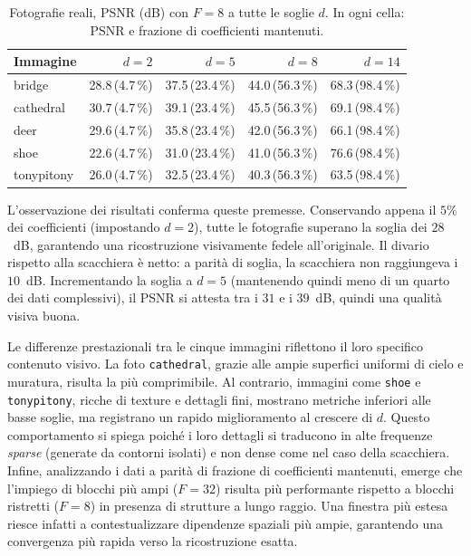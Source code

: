 \documentclass[11pt,a4paper]{article}
\makeatletter
\let\@origtexttt\texttt
\renewcommand{\texttt}[1]{{\def\_{\textunderscore\discretionary{}{}{}}\@origtexttt{#1}}}
\makeatother
\begin{document}
\begin{table}[H]
\centering
\footnotesize
\setlength{\tabcolsep}{6pt}
\caption{Fotografie reali, PSNR (dB) con $F=8$ a tutte le soglie $d$.
In ogni cella: PSNR e frazione di coefficienti mantenuti.}
\label{tab:real-sum}
\begin{tabular}{lrrrr}
\toprule
Immagine & $d=2$ & $d=5$ & $d=8$ & $d=14$ \\
\midrule
bridge      & 28.8\,\scriptsize(4.7\,\%) & 37.5\,\scriptsize(23.4\,\%) & 44.0\,\scriptsize(56.3\,\%) & 68.3\,\scriptsize(98.4\,\%) \\
cathedral   & 30.7\,\scriptsize(4.7\,\%) & 39.1\,\scriptsize(23.4\,\%) & 45.5\,\scriptsize(56.3\,\%) & 69.1\,\scriptsize(98.4\,\%) \\
deer        & 29.6\,\scriptsize(4.7\,\%) & 35.8\,\scriptsize(23.4\,\%) & 42.0\,\scriptsize(56.3\,\%) & 66.1\,\scriptsize(98.4\,\%) \\
shoe        & 22.6\,\scriptsize(4.7\,\%) & 31.0\,\scriptsize(23.4\,\%) & 41.0\,\scriptsize(56.3\,\%) & 76.6\,\scriptsize(98.4\,\%) \\
tonypitony  & 26.0\,\scriptsize(4.7\,\%) & 32.5\,\scriptsize(23.4\,\%) & 40.3\,\scriptsize(56.3\,\%) & 63.5\,\scriptsize(98.4\,\%) \\
\bottomrule
\end{tabular}
\end{table}

L'osservazione dei risultati conferma queste premesse. Conservando appena il 
$5\%$ dei coefficienti (impostando $d=2$), tutte le fotografie superano la soglia 
dei $28$~dB, garantendo una ricostruzione visivamente fedele all'originale. 
Il divario rispetto alla scacchiera è netto: a parità di soglia, la 
scacchiera non raggiungeva i $10$~dB.
Incrementando la soglia a $d=5$ (mantenendo quindi meno di 
un quarto dei dati complessivi), il PSNR si attesta tra i $31$ e i $39$~dB, quindi una qualità visiva buona. 

Le differenze prestazionali tra le cinque immagini riflettono il loro specifico 
contenuto visivo. La foto \texttt{cathedral}, grazie alle ampie superfici 
uniformi di cielo e muratura, risulta la più comprimibile. Al contrario, 
immagini come \texttt{shoe} e \texttt{tonypitony}, ricche di texture e 
dettagli fini, mostrano metriche inferiori alle basse soglie, ma registrano un 
rapido miglioramento al crescere di $d$. Questo comportamento si spiega poiché 
i loro dettagli si traducono in alte frequenze \emph{sparse} (generate da 
contorni isolati) e non dense come nel caso della scacchiera. Infine, 
analizzando i dati a parità di frazione di coefficienti mantenuti, emerge che 
l'impiego di blocchi più ampi ($F=32$) risulta più performante rispetto a blocchi 
ristretti ($F=8$) in presenza di strutture a lungo raggio. Una finestra più 
estesa riesce infatti a contestualizzare dipendenze spaziali più ampie, 
garantendo una convergenza più rapida verso la ricostruzione esatta.
\end{document}
